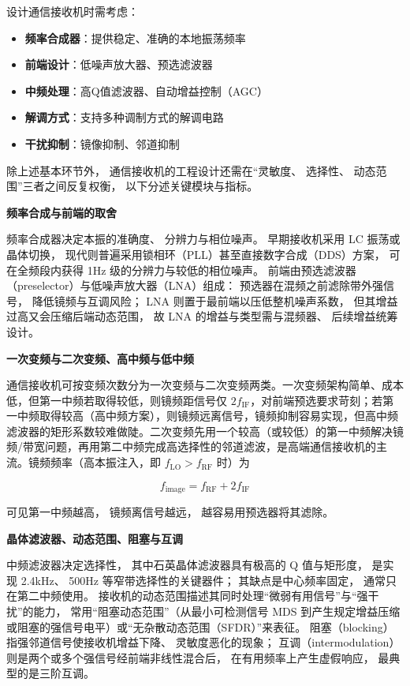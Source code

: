 设计通信接收机时需考虑：

\begin{itemize}
    \item \textbf{频率合成器}：提供稳定、准确的本地振荡频率
    \item \textbf{前端设计}：低噪声放大器、预选滤波器
    \item \textbf{中频处理}：高Q值滤波器、自动增益控制（AGC）
    \item \textbf{解调方式}：支持多种调制方式的解调电路
    \item \textbf{干扰抑制}：镜像抑制、邻道抑制
\end{itemize}

除上述基本环节外，
通信接收机的工程设计还需在“灵敏度、
选择性、
动态范围”三者之间反复权衡，
以下分述关键模块与指标。

\medskip\noindent\textbf{频率合成与前端的取舍}

频率合成器决定本振的准确度、
分辨力与相位噪声。
早期接收机采用 LC 振荡或晶体切换，
现代则普遍采用锁相环（PLL）甚至直接数字合成（DDS）方案，
可在全频段内获得 1Hz 级的分辨力与较低的相位噪声。
前端由预选滤波器（preselector）与低噪声放大器（LNA）组成：
预选器在混频之前滤除带外强信号，
降低镜频与互调风险；
LNA 则置于最前端以压低整机噪声系数，
但其增益过高又会压缩后端动态范围，
故 LNA 的增益与类型需与混频器、
后续增益统筹设计。

\medskip\noindent\textbf{一次变频与二次变频、高中频与低中频}

通信接收机可按变频次数分为一次变频与二次变频两类。一次变频架构简单、成本低，但第一中频若取得较低，则镜频距信号仅 $2f_{\mathrm{IF}}$，对前端预选要求苛刻；若第一中频取得较高（高中频方案），则镜频远离信号，镜频抑制容易实现，但高中频滤波器的矩形系数较难做陡。二次变频先用一个较高（或较低）的第一中频解决镜频/带宽问题，再用第二中频完成高选择性的邻道滤波，是高端通信接收机的主流。镜频频率（高本振注入，即 $f_{\mathrm{LO}}>f_{\mathrm{RF}}$ 时）为

\[
f_{\mathrm{image}}=f_{\mathrm{RF}}+2f_{\mathrm{IF}}
\]

可见第一中频越高，
镜频离信号越远，
越容易用预选器将其滤除。

\medskip\noindent\textbf{晶体滤波器、动态范围、阻塞与互调}

中频滤波器决定选择性，
其中石英晶体滤波器具有极高的 Q 值与矩形度，
是实现 2.4kHz、
500Hz 等窄带选择性的关键器件；
其缺点是中心频率固定，
通常只在第二中频使用。
接收机的动态范围描述其同时处理“微弱有用信号”与“强干扰”的能力，
常用“阻塞动态范围”（从最小可检测信号 MDS 到产生规定增益压缩或阻塞的强信号电平）或“无杂散动态范围（SFDR）”来表征。
阻塞（blocking）指强邻道信号使接收机增益下降、
灵敏度恶化的现象；
互调（intermodulation）则是两个或多个强信号经前端非线性混合后，
在有用频率上产生虚假响应，
最典型的是三阶互调。

